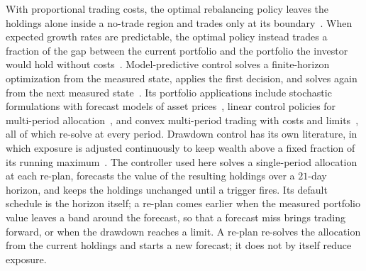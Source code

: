 With proportional trading costs, the optimal rebalancing policy leaves the holdings alone inside a no-trade region
and trades only at its boundary~\cite{magillConstantinides1976, davisNorman1990}. When expected growth rates are predictable, the
optimal policy instead trades a fraction of the gap between the current portfolio and the portfolio the investor
would hold without costs~\cite{garleanuPedersen2013}. Model-predictive control solves a finite-horizon optimization
from the measured state, applies the first decision, and solves again from the next measured
state~\cite{mayneEtAl2000}. Its portfolio applications include stochastic formulations with forecast models of asset
prices~\cite{herzogDondiGeering2007}, linear control policies for multi-period allocation~\cite{calafiore2008}, and
convex multi-period trading with costs and limits~\cite{boydEtAl2017}, all of which re-solve at every period.
Drawdown control has its own literature, in which exposure is adjusted continuously to keep wealth above a fixed
fraction of its running maximum~\cite{grossmanZhou1993}. The controller used here solves a single-period allocation
at each re-plan, forecasts the value of the resulting holdings over a $21$-day horizon, and keeps the holdings
unchanged until a trigger fires. Its default schedule is the horizon itself; a re-plan comes earlier when the
measured portfolio value leaves a band around the forecast, so that a forecast miss brings trading forward, or when
the drawdown reaches a limit. A re-plan re-solves the allocation from the current holdings and starts a new
forecast; it does not by itself reduce exposure.

